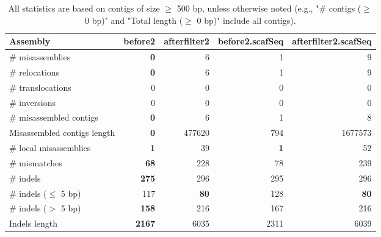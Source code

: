 \documentclass[12pt,a4paper]{article}
\begin{document}
\begin{table}[ht]
\begin{center}
\caption{All statistics are based on contigs of size $\geq$ 500 bp, unless otherwise noted (e.g., "\# contigs ($\geq$ 0 bp)" and "Total length ($\geq$ 0 bp)" include all contigs).}
\begin{tabular}{|l*{4}{|r}|}
\hline
Assembly & before2 & afterfilter2 & before2.scafSeq & afterfilter2.scafSeq \\ \hline
\# misassemblies & {\bf 0} & 6 & 1 & 9 \\ \hline
\hspace{5mm}\# relocations & {\bf 0} & 6 & 1 & 9 \\ \hline
\hspace{5mm}\# translocations & 0 & 0 & 0 & 0 \\ \hline
\hspace{5mm}\# inversions & 0 & 0 & 0 & 0 \\ \hline
\# misassembled contigs & {\bf 0} & 6 & 1 & 8 \\ \hline
Misassembled contigs length & {\bf 0} & 477620 & 794 & 1677573 \\ \hline
\# local misassemblies & {\bf 1} & 39 & {\bf 1} & 52 \\ \hline
\# mismatches & {\bf 68} & 228 & 78 & 239 \\ \hline
\# indels & {\bf 275} & 296 & 295 & 296 \\ \hline
\hspace{5mm}\# indels ($\leq$ 5 bp) & 117 & {\bf 80} & 128 & {\bf 80} \\ \hline
\hspace{5mm}\# indels ($>$ 5 bp) & {\bf 158} & 216 & 167 & 216 \\ \hline
Indels length & {\bf 2167} & 6035 & 2311 & 6039 \\ \hline
\end{tabular}
\end{center}
\end{table}
\end{document}
